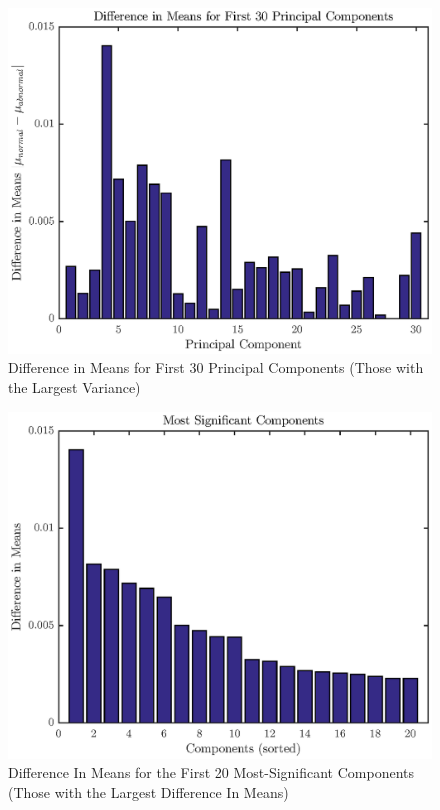 \documentclass[12pt,letter]{article}
\begin{document}
\begin{figure}[htbp]
    \centering
    \includegraphics[height=0.42\textheight]{../figures/train_03}
    \caption{Difference in Means for First 30 Principal Components (Those with
    the Largest Variance)}
    \label{fig:diff}
\end{figure}

\begin{figure}[hbtp]
    \centering
    \includegraphics[height=0.42\textheight]{../figures/train_04}
    \caption{Difference In Means for the First 20 Most-Significant Components
    (Those with the Largest Difference In Means)}
    \label{fig:sig}
\end{figure}
\end{document}
